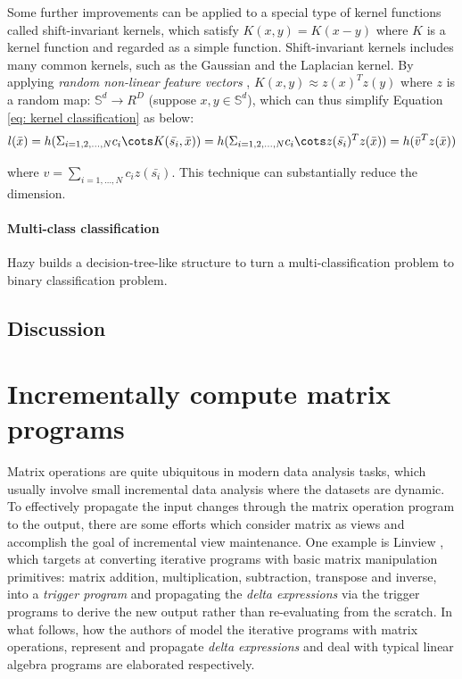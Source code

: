 Some further improvements can be applied to a special type of kernel functions called shift-invariant kernels, which satisfy $K(x, y) = K(x-y)$ where $K$ is a kernel function and regarded as a simple function. Shift-invariant kernels includes many common kernels, such as the Gaussian and the Laplacian kernel. By applying {\em random non-linear feature vectors} \cite{rahimi2008random}, $K(x, y) \approx z(x)^Tz(y)$ where $z$ is a random map: $\mathbb{S}^d \rightarrow R^D$ (suppose $x, y \in \mathbb{S}^d$), which can thus simplify Equation \ref{eq: kernel classification} as below:
\begin{equation}
    l(\bar{x})=h(\Sigma_{i=1,2,\dots,N}c_i\cots K(\bar{s_i}, \bar{x})) = h(\Sigma_{i=1,2,\dots,N}c_i\cots z(\bar{s_i})^Tz(\bar{x}))=h(\bar{v}^Tz(\bar{x}))
\end{equation}

where $v=\sum_{i=1,\dots,N}c_iz(\bar{s_i})$. This technique can substantially reduce the dimension.

\paragraph{Multi-class classification}
Hazy builds a decision-tree-like structure to turn a multi-classification problem to binary classification problem.


\subsection{Discussion}


\section{Incrementally compute matrix programs}
Matrix operations are quite ubiquitous in modern data analysis tasks, which usually involve small incremental data analysis where the datasets are dynamic. To effectively propagate the input changes through the matrix operation program to the output, there are some efforts which consider matrix as views and accomplish the goal of incremental view maintenance. One example is Linview \cite{nikolic2014linview}, which targets at converting iterative programs with basic matrix manipulation primitives: matrix addition, multiplication, subtraction, transpose and inverse, into a {\em trigger program} and propagating the {\em delta expressions} via the trigger programs to derive the new output rather than re-evaluating from the scratch. In what follows, how the authors of \cite{nikolic2014linview} model the iterative programs with matrix operations, represent and propagate {\em delta expressions} and deal with typical linear algebra programs are elaborated respectively.

